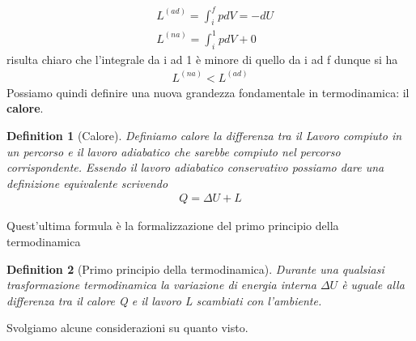 \documentclass[10pt,a4paper]{article}
\newtheorem{definition}{Definition}
\begin{document}
\begin{align*}
&L^{(ad)} = \int_{i}^{f} p dV = -dU\\
&L^{(na)} = \int_{i}^{1}pdV+0
\end{align*}
risulta chiaro che l'integrale da i ad 1 è minore di quello da i ad f dunque si ha
\begin{align*}
	L^{(na)}<L^{(ad)}
\end{align*}
Possiamo quindi definire una nuova grandezza fondamentale in termodinamica: il \textbf{calore}.
\begin{definition}[Calore]
	Definiamo calore la differenza tra il Lavoro compiuto in un percorso e il lavoro adiabatico che sarebbe compiuto nel percorso corrispondente. Essendo il lavoro adiabatico conservativo possiamo dare una definizione equivalente scrivendo
	\begin{align*}
		Q = \Delta U + L
	\end{align*}
\end{definition}
Quest'ultima formula è la formalizzazione del primo principio della termodinamica
\begin{definition}[Primo principio della termodinamica]
	Durante una qualsiasi trasformazione termodinamica la variazione di energia interna $\Delta U$ è uguale alla differenza tra il calore Q e il lavoro L scambiati con l'ambiente. 
\end{definition}
Svolgiamo alcune considerazioni su quanto visto.
\end{document}
